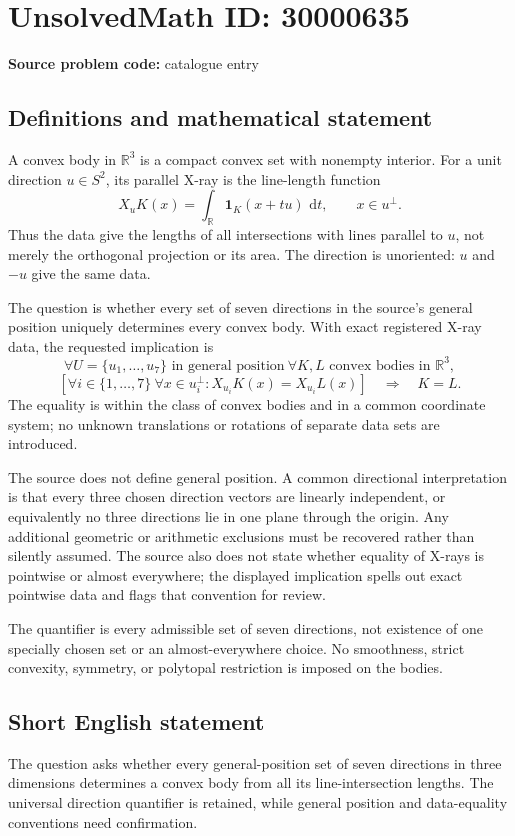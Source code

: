 \documentclass[11pt]{article}
\newcommand{\R}{\mathbb{R}}
\newcommand{\dd}{\,\mathrm{d}}
\begin{document}
\section*{UnsolvedMath ID: 30000635}
\textbf{Source problem code:} catalogue entry
\subsection{Definitions and mathematical statement}
A convex body in $\R^3$ is a compact convex set with nonempty interior. For a unit direction $u\in S^2$, its parallel X-ray is the line-length function
\[
 X_uK(x)=\int_{\R}\mathbf1_K(x+tu)\,\dd t,
 \qquad x\in u^\perp.
\]
Thus the data give the lengths of all intersections with lines parallel to $u$, not merely the orthogonal projection or its area. The direction is unoriented: $u$ and $-u$ give the same data.

The question is whether every set of seven directions in the source's general position uniquely determines every convex body. With exact registered X-ray data, the requested implication is
\[
 \forall U=\{u_1,\ldots,u_7\}\text{ in general position}\
 \forall K,L\text{ convex bodies in }\R^3,
\]
\[
 \left[\forall i\in\{1,\ldots,7\}\ \forall x\in u_i^\perp:
                 X_{u_i}K(x)=X_{u_i}L(x)\right]
       \quad\Longrightarrow\quad K=L.
\]
The equality is within the class of convex bodies and in a common coordinate system; no unknown translations or rotations of separate data sets are introduced.

The source does not define general position. A common directional interpretation is that every three chosen direction vectors are linearly independent, or equivalently no three directions lie in one plane through the origin. Any additional geometric or arithmetic exclusions must be recovered rather than silently assumed. The source also does not state whether equality of X-rays is pointwise or almost everywhere; the displayed implication spells out exact pointwise data and flags that convention for review.

The quantifier is every admissible set of seven directions, not existence of one specially chosen set or an almost-everywhere choice. No smoothness, strict convexity, symmetry, or polytopal restriction is imposed on the bodies.
\subsection{Short English statement}
The question asks whether every general-position set of seven directions in three dimensions determines a convex body from all its line-intersection lengths. The universal direction quantifier is retained, while general position and data-equality conventions need confirmation.
\end{document}
